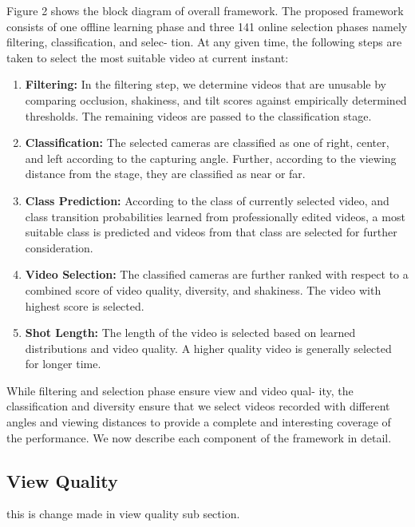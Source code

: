 \documentclass{new}
\begin{document}
Figure 2 shows the block diagram of overall framework. The
proposed framework consists of one offline learning phase and three
141 online selection phases namely filtering, classification, and selec-
tion. At any given time, the following steps are taken to select the
most suitable video at current instant:

\begin{enumerate}
\item \textbf{Filtering:} In the filtering step, we determine videos that are
unusable by comparing occlusion, shakiness, and tilt scores
against empirically determined thresholds. The remaining
videos are passed to the classification stage.

\item \textbf{Classification:} The selected cameras are classified as one
of right, center, and left according to the capturing angle.
Further, according to the viewing distance from the stage,
they are classified as near or far.

\item \textbf{Class Prediction:} According to the class of currently selected video, and class transition probabilities learned from
professionally edited videos, a most suitable class is predicted and videos from that class are selected for further consideration.  

\item \textbf{Video Selection:} The classified cameras are further ranked
with respect to a combined score of video quality, diversity,
and shakiness. The video with highest score is selected.

\item \textbf{Shot Length:} The length of the video is selected based on
learned distributions and video quality. A higher quality video
is generally selected for longer time.

\end{enumerate}

While filtering and selection phase ensure view and video qual-
ity, the classification and diversity ensure that we select videos
recorded with different angles and viewing distances to provide a
complete and interesting coverage of the performance. We now
describe each component of the framework in detail.


\subsection{View Quality}
this is change made in view quality sub  section.
\end{document}
